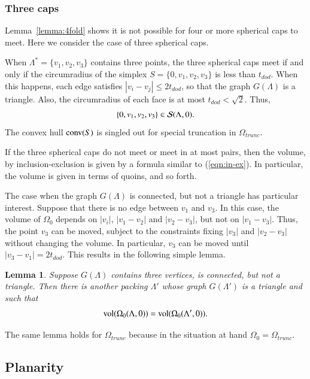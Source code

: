 \documentclass{article} %
\newtheorem{lemma}{Lemma}[subsection]
\begin{document}
\subsubsection{Three caps}

Lemma~\ref{lemma:4fold} shows it is not possible for four or more
spherical caps to meet.  Here we consider the case of three spherical
caps.

When $\Lambda^*=\{v_1,v_2,v_3\}$ contains three points, the three
spherical caps meet if and only if the circumradius of the simplex
$S=\{0,v_1,v_2,v_3\}$ is less than $t_{dod}$. When this happens, each
edge satisfies $|v_i-v_j|\le 2t_{dod}$, so that the graph $G(\Lambda)$ is a
triangle. Also, the circumradius of each face is at most $t_{dod} <
\sqrt2$. Thus,
$$\{0,v_1,v_2,v_3\}\in{\mathcal S}(\Lambda,0).$$
The convex hull ${\operatorname{conv}}(S)$ is singled out for special truncation in
$\Omega_{trunc}$.

If the three spherical caps do not meet or meet in at most pairs,
then the volume, by inclusion-exclusion is given by a formula
similar to (\ref{eqn:in-ex}).  In particular, the volume
is given in terms of quoins, and so forth.

The case when the graph $G(\Lambda)$ is connected, but not a triangle
has particular interest.  Suppose that there is no edge between
$v_1$ and $v_3$. In this case, the volume of $\Omega_0$ depends on
$|v_i|$, $|v_1-v_2|$ and $|v_2-v_3|$, but not on $|v_1-v_3|$.
Thus, the point $v_3$ can be moved, subject to the constraints
fixing $|v_3|$ and $|v_2-v_3|$ without changing the volume.
In particular, $v_3$ can be moved until $|v_3-v_1|=2t_{dod}$.  This
results in the following simple lemma.  

\begin{lemma}\label{lemma:3tri}  
Suppose $G(\Lambda)$ contains three vertices,
is connected, but not a triangle.  Then there is another packing
$\Lambda'$ whose graph $G(\Lambda')$ is a triangle and such
that
$$
{\operatorname{vol}}(\Omega_0(\Lambda,0)) = {\operatorname{vol}}(\Omega_0(\Lambda',0)).
$$
\end{lemma}

The same lemma holds for $\Omega_{trunc}$ because in the situation at
hand $\Omega_0=\Omega_{trunc}$. 

\subsection{Planarity}
\end{document}
